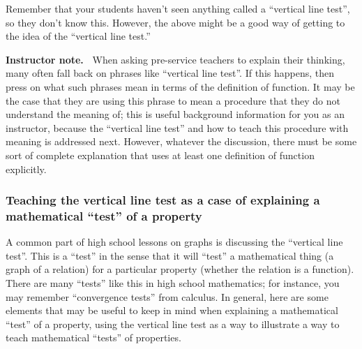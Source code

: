 \documentclass[11pt]{article}
\newenvironment{bignote}[1][Instructor note]%
	{\begin{mdframed}\raggedright{\bf #1.~}}
	{\end{mdframed}}
\theoremstyle{definition}
\begin{document}
Remember that your students haven't seen anything called a ``vertical line test'', so they don't know this. However, the above might be a good way of getting to the idea of the ``vertical line test.''

\begin{bignote}
When asking pre-service teachers to explain their thinking, many often fall back on phrases like ``vertical line test''. If this happens, then press on what such phrases mean in terms of the definition of function. It may be the case that they are using this phrase to mean a procedure that they do not understand the meaning of; this is useful background information for you as an instructor, because the ``vertical line test'' and how to teach this procedure with meaning is addressed next. However, whatever the discussion, there must be some sort of complete explanation that uses at least one definition of function explicitly.
\end{bignote}

\subsubsection{Teaching the vertical line test as a case of explaining a mathematical ``test'' of a property}
\label{s: mathematical test of a property}

A common part of high school lessons on graphs is discussing the ``vertical line test''. This is a ``test'' in the sense that it will ``test'' a mathematical thing (a graph of a relation) for a particular property (whether the relation is a function). There are many ``tests'' like this in high school mathematics; for instance, you may remember ``convergence tests'' from calculus. In general, here are some elements that may be useful to keep in mind when explaining a mathematical ``test'' of a property, using the vertical line test as a way to illustrate a way to teach mathematical ``tests'' of properties. 
\end{document}
